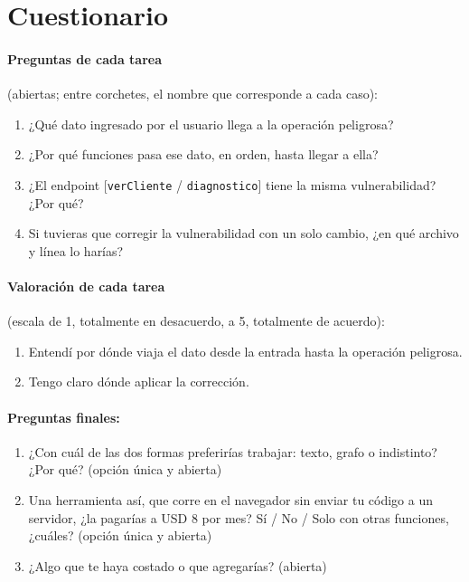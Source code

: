 \section{Cuestionario}

\paragraph{Preguntas de cada tarea} (abiertas; entre corchetes, el
nombre que corresponde a cada caso):
\begin{enumerate}
    \item[P1.] ¿Qué dato ingresado por el usuario llega a la operación
          peligrosa?
    \item[P2.] ¿Por qué funciones pasa ese dato, en orden, hasta llegar a
          ella?
    \item[P3.] ¿El endpoint [\texttt{verCliente} / \texttt{diagnostico}]
          tiene la misma vulnerabilidad? ¿Por qué?
    \item[P4.] Si tuvieras que corregir la vulnerabilidad con un solo
          cambio, ¿en qué archivo y línea lo harías?
\end{enumerate}

\paragraph{Valoración de cada tarea} (escala de 1, totalmente en
desacuerdo, a 5, totalmente de acuerdo):
\begin{enumerate}
    \item[L1.] Entendí por dónde viaja el dato desde la entrada hasta la
          operación peligrosa.
    \item[L2.] Tengo claro dónde aplicar la corrección.
\end{enumerate}

\paragraph{Preguntas finales:}
\begin{enumerate}
    \item[F1.] ¿Con cuál de las dos formas preferirías trabajar: texto,
          grafo o indistinto? ¿Por qué? (opción única y abierta)
    \item[F2.] Una herramienta así, que corre en el navegador sin enviar
          tu código a un servidor, ¿la pagarías a USD 8 por mes? Sí / No /
          Solo con otras funciones, ¿cuáles? (opción única y abierta)
    \item[F3.] ¿Algo que te haya costado o que agregarías? (abierta)
\end{enumerate}

